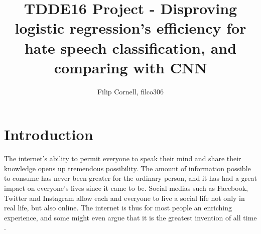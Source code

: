 \documentclass[twocolumn]{article}
\title{TDDE16 Project - Disproving logistic regression's efficiency for hate speech classification, and comparing with CNN}
\author{Filip Cornell, filco306}
\begin{document}
\maketitle
{}
\section{Introduction}

The internet's ability to permit everyone to speak their mind and share their knowledge opens up tremendous possibility. The amount of information possible to consume has never been greater for the ordinary person, and it has had a great impact on everyone's lives since it came to be. Social medias such as Facebook, Twitter and Instagram allow each and everyone to live a social life not only in real life, but also online. The internet is thus for most people an enriching experience, and some might even argue that it is the greatest invention of all time \cite{sleeve}. 
\end{document}

